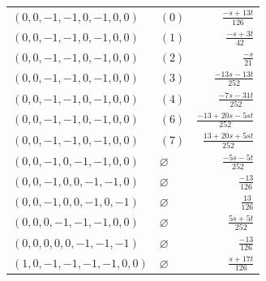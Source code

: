 \begin{longtable}{@{}llr@{}}
$(0,0,-1,-1,0,-1,0,0)$ & $(0)$ & $\frac{-s+13t}{126}$\\
$(0,0,-1,-1,0,-1,0,0)$ & $(1)$ & $\frac{-s+3t}{42}$\\
$(0,0,-1,-1,0,-1,0,0)$ & $(2)$ & $\frac{-s}{21}$\\
$(0,0,-1,-1,0,-1,0,0)$ & $(3)$ & $\frac{-13s-13t}{252}$\\
$(0,0,-1,-1,0,-1,0,0)$ & $(4)$ & $\frac{-7s-31t}{252}$\\
$(0,0,-1,-1,0,-1,0,0)$ & $(6)$ & $\frac{-13+20s-5st}{252}$\\
$(0,0,-1,-1,0,-1,0,0)$ & $(7)$ & $\frac{13+20s+5st}{252}$\\
$(0,0,-1,0,-1,-1,0,0)$ & $\varnothing$ & $\frac{-5s-5t}{252}$\\
$(0,0,-1,0,0,-1,-1,0)$ & $\varnothing$ & $\frac{-13}{126}$\\
$(0,0,-1,0,0,-1,0,-1)$ & $\varnothing$ & $\frac{13}{126}$\\
$(0,0,0,-1,-1,-1,0,0)$ & $\varnothing$ & $\frac{5s+5t}{252}$\\
$(0,0,0,0,0,-1,-1,-1)$ & $\varnothing$ & $\frac{-13}{126}$\\
$(1,0,-1,-1,-1,-1,0,0)$ & $\varnothing$ & $\frac{s+17t}{126}$\\
\end{longtable}
\endgroup
